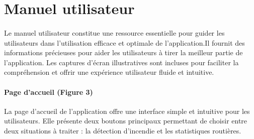 \newpage

\section{Manuel utilisateur}
\label{sec:manuel} 

\paragraph{} Le manuel utilisateur constitue une ressource essentielle pour guider les utilisateurs dans l'utilisation efficace et optimale de l'application.Il fournit des informations précieuses pour aider les utilisateurs à tirer la meilleur partie de l'application. Les captures d'écran illustratives sont incluses pour faciliter la compréhension et offrir une expérience utilisateur fluide et intuitive.

\paragraph{Page d'accueil (Figure 3)}La page d'accueil de l'application offre une interface simple et intuitive pour les utilisateurs. Elle présente deux boutons principaux permettant de choisir entre deux situations à traiter : la détection d'incendie et les statistiques routières.




